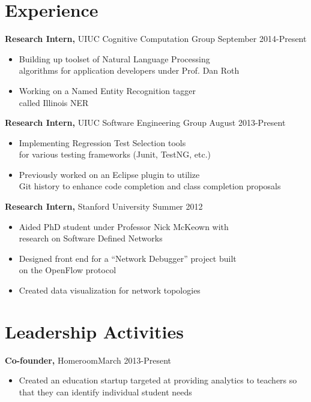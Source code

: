\documentclass[margin]{res}
\begin{document}
\begin{resume}
\section{Experience}
 {\bf Research Intern,} UIUC Cognitive Computation Group \hfill September 2014-Present
 \begin{itemize} \itemsep -3pt
 \item Building up toolset of Natural Language Processing \\
       algorithms for application developers under Prof. Dan Roth
 \item Working on a Named Entity Recognition tagger\\ called Illinois NER
 \end{itemize}
 \parskip 2pt
 {\bf Research Intern,} UIUC Software Engineering Group \hfill August 2013-Present
 \begin{itemize} \itemsep -3pt  %
 \item Implementing Regression Test Selection tools \\for various testing frameworks (Junit, TestNG, etc.)
 \item Previously worked on an Eclipse plugin to utilize \\Git history to enhance code completion and class completion proposals
 \end{itemize}
 
 
{\bf Research Intern,} Stanford University \hfill  Summer 2012
\begin{itemize} \itemsep -3pt %
\item Aided PhD student under Professor Nick McKeown with\\ research on Software Defined Networks 
\item Designed front end for a “Network Debugger” project built\\ on the OpenFlow protocol 
\item Created data visualization for network topologies 
\end{itemize}


\section{Leadership   Activities} 
               {\bf Co-founder,} Homeroom\hfill March 2013-Present \parskip -2pt
                \begin{itemize} \itemsep -3pt
              \item Created an education startup targeted at providing analytics to teachers so that they can identify individual student needs
                 

\end{itemize}
\end{resume}
\end{document}
